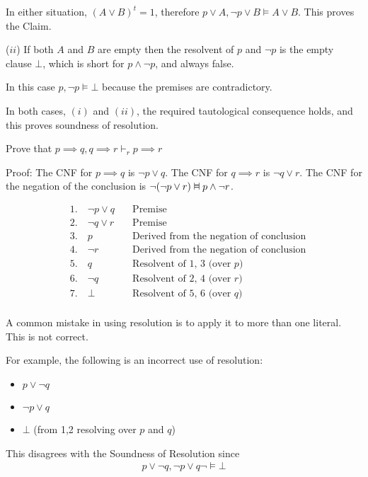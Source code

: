 \documentclass{article}
\newcommand{\vDashv}{%
  \mathrel{%
    \text{%
      \ooalign{$\vDash$\cr\reflectbox{$\vDash$}\cr}%
    }%
  }%
}
\begin{document}
In either situation, $(A \vee B)^t = 1$, therefore $p \vee A, \neg p \vee B \vDash A \vee B$. This proves the Claim.

($ii$) If both $A$ and $B$ are empty then the resolvent of $p$ and $\neg p$ is the empty clause $\bot$, which is short for $p \wedge \neg p$, and always false.

In this case $p, \neg p \vDash \bot$ because the premises are contradictory.

In both cases, $(i)$ and $(ii)$, the required tautological consequence holds, and this proves soundness of resolution.

Prove that $p \implies q, q \implies r \vdash_r p \implies r$

Proof: The CNF for $p \implies q$ is $\neg p \vee q$. The CNF for $q \implies r$ is $\neg q \vee r$. The CNF for the negation of the conclusion is $\neg (\neg p \vee r) \vDashv p \wedge \neg r$.

\begin{align*}
&1. \quad \neg p \vee q \quad &\text{Premise} \\
&2. \quad  \neg q \vee r \quad &\text{Premise} \\
&3. \quad  p  \quad &\text{Derived from the negation of conclusion} \\
&4. \quad  \neg r  \quad &\text{Derived from the negation of conclusion} \\
&5. \quad  q  \quad &\text{Resolvent of 1, 3 (over } p) \\
&6. \quad  \neg q  \quad &\text{Resolvent of 2, 4 (over } r) \\
&7. \quad  \bot  \quad &\text{Resolvent of 5, 6 (over } q) \\
\end{align*}

A common mistake in using resolution is to apply it to more than one literal. This is not correct. 

For example, the following is an incorrect use of resolution:
\begin{itemize}
    \item $p \vee \neg q$ \\
    \item $\neg p \vee q$ \\
    \item $\bot$ (from 1,2 resolving over $p$ and $q$)
\end{itemize}

This disagrees with the Soundness of Resolution since
\begin{align*}
p \vee \neg q, \neg p \vee q \neg\vDash \bot
\end{align*}
\end{document}
